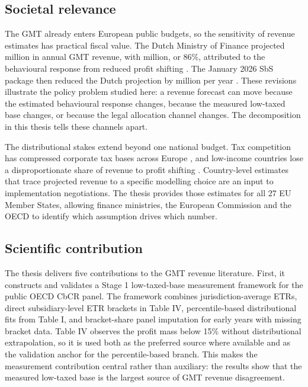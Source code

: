 \documentclass[11pt,a4paper]{article}
\newcommand{\EUR}{\texteuro}
\begin{document}
\subsection{Societal relevance}\label{sec:relevance}

The GMT already enters European public budgets, so the sensitivity of revenue estimates has practical fiscal value. The Dutch Ministry of Finance projected \EUR466 million in annual GMT revenue, with \EUR402 million, or 86\%, attributed to the behavioural response from reduced profit shifting \citep{36369_3}. The January 2026 SbS package then reduced the Dutch projection by \EUR122 million per year \citep{1028}. These revisions illustrate the policy problem studied here: a revenue forecast can move because the estimated behavioural response changes, because the measured low-taxed base changes, or because the legal allocation channel changes. The decomposition in this thesis tells these channels apart.

The distributional stakes extend beyond one national budget. Tax competition has compressed corporate tax bases across Europe \citep{cassee2019}, and low-income countries lose a disproportionate share of revenue to profit shifting \citep{cobham2018,garcia-bernardo2024}. Country-level estimates that trace projected revenue to a specific modelling choice are an input to implementation negotiations. The thesis provides those estimates for all 27 EU Member States, allowing finance ministries, the European Commission and the OECD to identify which assumption drives which number.

\subsection{Scientific contribution}\label{sec:contribution}

The thesis delivers five contributions to the GMT revenue literature. First, it constructs and validates a Stage 1 low-taxed-base measurement framework for the public OECD CbCR panel. The framework combines jurisdiction-average ETRs, direct subsidiary-level ETR brackets in Table IV, percentile-based distributional fits from Table I, and bracket-share panel imputation for early years with missing bracket data. Table IV observes the profit mass below 15\% without distributional extrapolation, so it is used both as the preferred source where available and as the validation anchor for the percentile-based branch. This makes the measurement contribution central rather than auxiliary: the results show that the measured low-taxed base is the largest source of GMT revenue disagreement.
\end{document}
